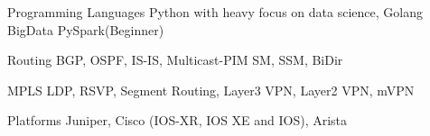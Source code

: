 

\begin{cvskills}

  \cvskill
    {Programming Languages} %
    {Python with heavy focus on data science, Golang} %
  \cvskill
    {BigData} %
    {PySpark(Beginner)} %

  \cvskill
    {Routing} %
    {BGP, OSPF, IS-IS, Multicast-PIM SM, SSM, BiDir} %

  \cvskill
    {MPLS} %
    {LDP, RSVP, Segment Routing, Layer3 VPN, Layer2 VPN, mVPN} %

  \cvskill
    {Platforms} %
    {Juniper, Cisco (IOS-XR, IOS XE and IOS), Arista} %


\end{cvskills}
